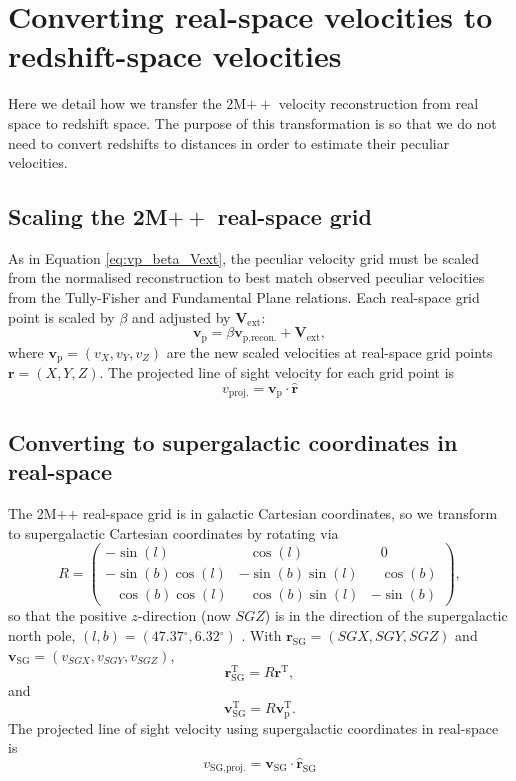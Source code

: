\documentclass[
  journal=pasa,
  manuscript=research-paper,
  year=2022,
]{cup-journal}
\newcommand\dg{\ensuremath{^{\circ}}}
\newcommand{\Vext}{\ensuremath{\bm{V}_{\text{ext}}}}
\begin{document}
\newpage
\clearpage
\section{Converting real-space velocities to redshift-space velocities}\label{sec:vpecgrids}
Here we detail how we transfer the 2M$++$ velocity reconstruction from real space to redshift space.  The purpose of this transformation is so that we do not need to convert redshifts to distances in order to estimate their peculiar velocities.
\subsection{Scaling the 2M$++$ real-space grid}
As in Equation \ref{eq:vp_beta_Vext}, the peculiar velocity grid must be scaled from the normalised reconstruction to best match observed peculiar velocities from the Tully-Fisher and Fundamental Plane relations.
Each real-space grid point is scaled by $\beta$ and adjusted by \Vext{}:
\begin{equation}
    \bm{v}_{\text{p}} = \beta \bm{v}_{\text{p,recon.}} + \Vext{},
\end{equation}
where $\bm{v}_{\text{p}} = (v_X, v_Y, v_Z)$ 
are the new scaled velocities at real-space grid points $\bm{r}=(X, Y, Z)$. 
The projected line of sight velocity for each grid point is
\begin{equation}
    v_{\text{proj.}} = \bm{v}_{\text{p}}\cdot\hat{\bm{r}}
\end{equation}

\subsection{Converting to supergalactic coordinates in real-space}
The 2M++ real-space grid is in galactic Cartesian coordinates, so we transform to supergalactic Cartesian coordinates by rotating via
\begin{equation}
    R = \begin{pmatrix}
    -\sin(l) & \;\;\,\cos(l) & \;\;\, 0 \\
    -\sin(b)\cos(l) & -\sin(b)\sin(l) & \;\;\,\cos(b) \\
    \;\;\,\cos(b)\cos(l) & \;\;\,\cos(b)\sin(l) & -\sin(b)
    \end{pmatrix},
\end{equation}
so that the positive $z$-direction (now $SGZ$) is in the direction of the supergalactic north pole, $(l,b)=(47.37\dg,6.32\dg)$ \citep{Lahav2000}. 
With $\bm{r}_{\text{SG}}=(SGX,SGY,SGZ)$ and $\bm{v}_{\text{SG}}=(v_{SGX},v_{SGY},v_{SGZ})$,
\begin{equation}
    \bm{r}_{\text{SG}}^{\text{T}} = R\bm{r}^{\text{T}},
\end{equation}
and
\begin{equation}
    \bm{v}_{\text{SG}}^{\text{T}} = R\bm{v}_{\text{p}}^{\text{T}}.
\end{equation}
The projected line of sight velocity using supergalactic coordinates in real-space is
\begin{equation}
    v_{\text{SG,proj.}} = \bm{v}_{\text{SG}}\cdot\hat{\bm{r}}_{\text{SG}}
\end{equation}
\end{document}
